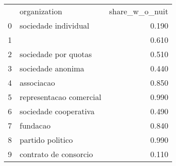 \begin{tabular}{llr}
 & organization & share_w_o_nuit \\
0 & sociedade individual & 0.190 \\
1 &  & 0.610 \\
2 & sociedade por quotas & 0.510 \\
3 & sociedade anonima & 0.440 \\
4 & associacao & 0.850 \\
5 & representacao comercial & 0.990 \\
6 & sociedade cooperativa & 0.490 \\
7 & fundacao & 0.840 \\
8 & partido politico & 0.990 \\
9 & contrato de consorcio & 0.110 \\
\end{tabular}
